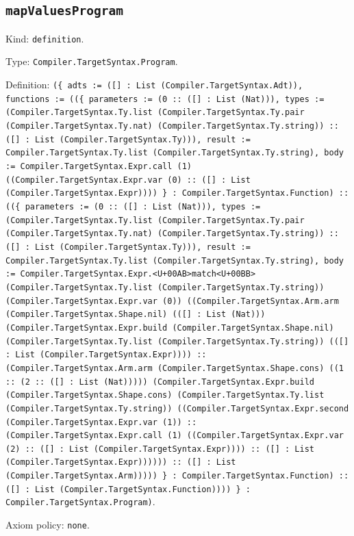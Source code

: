 \documentclass[11pt]{article}
\begin{document}
\subsection*{\texttt{mapValuesProgram}}
\noindent Kind: \texttt{definition}.\par
\noindent Type: \texttt{Compiler.TargetSyntax.Program}.\par
\noindent Definition: \texttt{(\{ adts := ([] : List (Compiler.TargetSyntax.Adt)), functions := ((\{ parameters := (0 :: ([] : List (Nat))), types := (Compiler.TargetSyntax.Ty.list (Compiler.TargetSyntax.Ty.pair (Compiler.TargetSyntax.Ty.nat) (Compiler.TargetSyntax.Ty.string)) :: ([] : List (Compiler.TargetSyntax.Ty))), result := Compiler.TargetSyntax.Ty.list (Compiler.TargetSyntax.Ty.string), body := Compiler.TargetSyntax.Expr.call (1) ((Compiler.TargetSyntax.Expr.var (0) :: ([] : List (Compiler.TargetSyntax.Expr)))) \} : Compiler.TargetSyntax.Function) :: ((\{ parameters := (0 :: ([] : List (Nat))), types := (Compiler.TargetSyntax.Ty.list (Compiler.TargetSyntax.Ty.pair (Compiler.TargetSyntax.Ty.nat) (Compiler.TargetSyntax.Ty.string)) :: ([] : List (Compiler.TargetSyntax.Ty))), result := Compiler.TargetSyntax.Ty.list (Compiler.TargetSyntax.Ty.string), body := Compiler.TargetSyntax.Expr.<U+00AB>match<U+00BB> (Compiler.TargetSyntax.Ty.list (Compiler.TargetSyntax.Ty.string)) (Compiler.TargetSyntax.Expr.var (0)) ((Compiler.TargetSyntax.Arm.arm (Compiler.TargetSyntax.Shape.nil) (([] : List (Nat))) (Compiler.TargetSyntax.Expr.build (Compiler.TargetSyntax.Shape.nil) (Compiler.TargetSyntax.Ty.list (Compiler.TargetSyntax.Ty.string)) (([] : List (Compiler.TargetSyntax.Expr)))) :: (Compiler.TargetSyntax.Arm.arm (Compiler.TargetSyntax.Shape.cons) ((1 :: (2 :: ([] : List (Nat))))) (Compiler.TargetSyntax.Expr.build (Compiler.TargetSyntax.Shape.cons) (Compiler.TargetSyntax.Ty.list (Compiler.TargetSyntax.Ty.string)) ((Compiler.TargetSyntax.Expr.second (Compiler.TargetSyntax.Expr.var (1)) :: (Compiler.TargetSyntax.Expr.call (1) ((Compiler.TargetSyntax.Expr.var (2) :: ([] : List (Compiler.TargetSyntax.Expr)))) :: ([] : List (Compiler.TargetSyntax.Expr)))))) :: ([] : List (Compiler.TargetSyntax.Arm))))) \} : Compiler.TargetSyntax.Function) :: ([] : List (Compiler.TargetSyntax.Function)))) \} : Compiler.TargetSyntax.Program)}.\par
\noindent Axiom policy: \texttt{none}.\par
\end{document}
